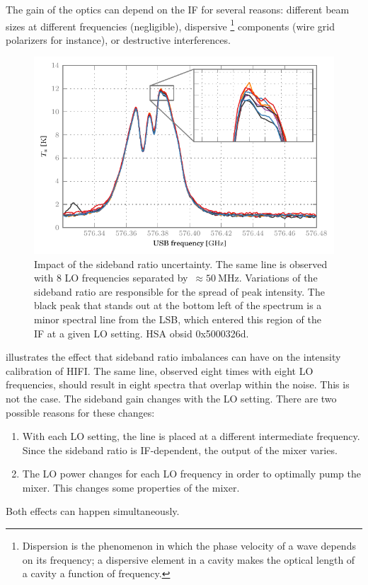 The gain of the optics can depend on the IF for several reasons:
different beam sizes at different frequencies (negligible), dispersive%
\footnote{
    Dispersion is the phenomenon in which the phase velocity of a wave depends on its frequency; a dispersive element in a cavity makes the optical length of a cavity a function of frequency.
}
components (wire grid polarizers for instance), or destructive interferences.

\begin{figure}
    \centering
    \includegraphics{sbr_effect}
    \caption{
        Impact of the sideband ratio uncertainty.
        The same line is observed with 8 LO frequencies separated by~$\approx \SI{50}{\mega\hertz}$.
        Variations of the sideband ratio are responsible for the spread of peak intensity.
        The black peak that stands out at the bottom left of the spectrum is a minor spectral line from the LSB, which entered this region of the IF at a given LO setting.
        HSA obsid 0x5000326d.
    }
    \label{fig:sbr_effect}
\end{figure}
 illustrates the effect that sideband ratio imbalances can have on the intensity calibration of HIFI.
The same line, observed eight times with eight LO frequencies, should result in eight spectra that overlap within the noise.
This is not the case.
The sideband gain changes with the LO setting.
There are two possible reasons for these changes:
\begin{enumerate}
    \item With each LO setting, the line is placed at a different intermediate frequency.  Since the sideband ratio is IF-dependent, the output of the mixer varies.
    \item The LO power changes for each LO frequency in order to optimally pump the mixer.
    This changes some properties of the mixer.
\end{enumerate}
Both effects can happen simultaneously.

